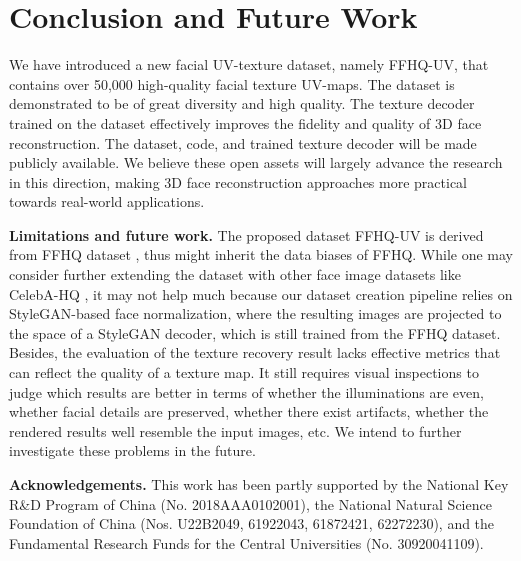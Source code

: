 \documentclass[10pt,twocolumn,letterpaper]{article}
\begin{document}
\vspace{-2mm}
\section{Conclusion and Future Work}
\vspace{-2mm}

We have introduced a new facial UV-texture dataset, namely FFHQ-UV, that contains over 50,000 high-quality facial texture UV-maps. 
The dataset is demonstrated to be of great diversity and high quality. 
The texture decoder trained on the dataset effectively improves the fidelity and quality of 3D face reconstruction. 
The dataset, code, and trained texture decoder will be made publicly available. 
We believe these open assets will largely advance the research in this direction, making 3D face reconstruction approaches more practical towards real-world applications.


\noindent\textbf{Limitations and future work.}
The proposed dataset FFHQ-UV is derived from FFHQ dataset \cite{karras2019style}, thus might inherit the data biases of FFHQ. 
While one may consider further extending the dataset with other face image datasets like CelebA-HQ \cite{karras2017progressive}, it may not help much because our dataset creation pipeline relies on StyleGAN-based face normalization, where the resulting images are projected to the space of a StyleGAN decoder, which is still trained from the FFHQ dataset. 
Besides, the evaluation of the texture recovery result lacks effective metrics that can reflect the quality of a texture map. 
It still requires visual inspections to judge which results are better in terms of whether the illuminations are even, whether facial details are preserved, whether there exist artifacts, whether the rendered results well resemble the input images, etc. 
We intend to further investigate these problems in the future. 


\noindent\textbf{Acknowledgements.}
This work has been partly supported by the National Key R\&D Program of China (No. 2018AAA0102001), the National Natural Science Foundation of China (Nos. U22B2049, 61922043, 61872421, 62272230), and the Fundamental Research Funds for the Central Universities (No. 30920041109).


\clearpage
{\small


}
\end{document}
